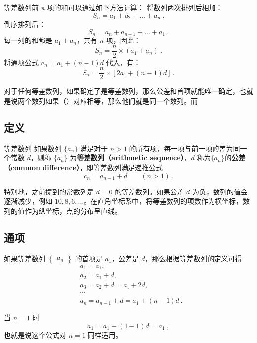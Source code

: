 等差数列前 $n$ 项的和可以通过如下方法计算：  
将数列两次排列后相加：
\[
S_n = a_1 + a_2 + \dots + a_n
~.\]
倒序排列后：
\[
S_n = a_n + a_{n-1} + \dots + a_1
~.\]
每一列的和都是 $a_1 + a_n$，共有 $n$ 项，因此：
\[
S_n = \frac{n}{2} \times (a_1 + a_n)
~.\]
将通项公式 $a_n = a_1 + (n-1)d$ 代入，有：
\[
S_n = \frac{n}{2} \times [2a_1 + (n-1)d]
~.\]

对于任何等差数列，如果确定了是等差数列，那么公差和首项就能唯一确定，也就是说两个数列如果（）对应相等，那么他们就是同一个数列。而



\subsection{定义}

\begin{definition}{等差数列}
如果数列 $\{a_n\}$ 满足对于 $n > 1$ 的所有项，每一项与前一项的差为同一个常数 $d$，则称 $\{a_n\}$ 为\textbf{等差数列（arithmetic sequence）}，$d$ 称为$\{a_n\}$的\textbf{公差（common difference）}，即等差数列满足递推公式
\begin{equation}
a_{n}=a_{n-1}+d\qquad(n>1)~.
\end{equation}
\end{definition}

特别地，之前提到的常数列是 $d = 0$ 的等差数列。如果公差 $d$ 为负，数列的值会逐渐减少，例如 $10, 8, 6, \dots$。在直角坐标系中，将等差数列的项数作为横坐标，数列的值作为纵坐标，点的分布呈直线。

\subsection{通项}
如果等差数列 $\begin{Bmatrix} a_n \end{Bmatrix}$ 的首项是 $a_1$，公差是 $d$，那么根据等差数列的定义可得
\begin{equation}
\begin{aligned}
&a_1 = a_1,\\
&a_2 = a_1 + d,\\
&a_3 = a_2 + d = a_1 + 2d,\\
&\cdots \\
&a_n = a_{n-1} + d = a_1 + (n - 1)d~.
\end{aligned}
\end{equation}

当 $n = 1$ 时
\begin{equation}
a_1 = a_1 + (1 - 1)d = a_1~,
\end{equation}
也就是说这个公式对 $n = 1$ 同样适用。

